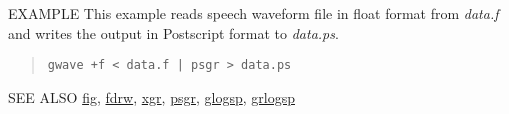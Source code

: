 \begin{qsection}{EXAMPLE}
This example reads speech waveform file in float format from
{\em data.f} and writes the output in Postscript format to
{\em data.ps}.
\begin{quote}
 \verb!gwave +f < data.f | psgr > data.ps!
 \end{quote}
\end{qsection}

\begin{qsection}{SEE ALSO}
\hyperlink{fig}{fig},
\hyperlink{fdrw}{fdrw},
\hyperlink{xgr}{xgr},
\hyperlink{psgr}{psgr},
\hyperlink{glogsp}{glogsp},
\hyperlink{grlogsp}{grlogsp}
\end{qsection}
